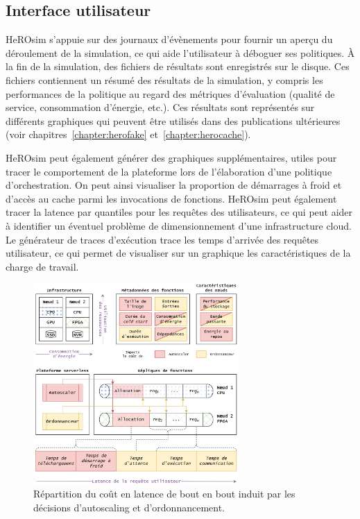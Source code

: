 \subsection{Interface utilisateur}

HeROsim s'appuie sur des journaux d'évènements pour fournir un aperçu du déroulement de la simulation, ce qui aide l'utilisateur à déboguer ses politiques. À la fin de la simulation, des fichiers de résultats sont enregistrés sur le disque. Ces fichiers contiennent un résumé des résultats de la simulation, y compris les performances de la politique au regard des métriques d'évaluation (qualité de service, consommation d'énergie, etc.). Ces résultats sont représentés sur différents graphiques qui peuvent être utilisés dans des publications ultérieures (voir chapitres~\ref{chapter:herofake} et~\ref{chapter:herocache}).

HeROsim peut également générer des graphiques supplémentaires, utiles pour tracer le comportement de la plateforme lors de l'élaboration d'une politique d'orchestration. On peut ainsi visualiser la proportion de démarrages à froid et d'accès au cache parmi les invocations de fonctions. HeROsim peut également tracer la latence par quantiles pour les requêtes des utilisateurs, ce qui peut aider à identifier un éventuel problème de dimensionnement d'une infrastructure cloud. Le générateur de traces d'exécution trace les temps d'arrivée des requêtes utilisateur, ce qui permet de visualiser sur un graphique les caractéristiques de la charge de travail.

\begin{figure}[!ht]
    \centering
    \includegraphics[width=0.7\textwidth]{6_Chapitre6/figures/serverless-cost.png}
    \caption{Répartition du coût en latence de bout en bout induit par les décisions d'autoscaling et d'ordonnancement.}
\label{figure:herosim-cost}
\end{figure}

